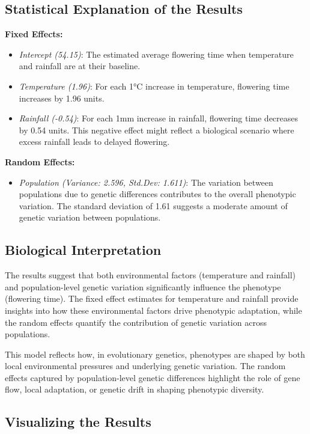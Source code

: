 \documentclass[12pt,a4paper]{article}
\begin{document}
\subsection{Statistical Explanation of the Results}

\textbf{Fixed Effects:}
\begin{itemize}
    \item \textit{Intercept (54.15)}: The estimated average flowering time when temperature and rainfall are at their baseline.
    \item \textit{Temperature (1.96)}: For each 1°C increase in temperature, flowering time increases by 1.96 units.
    \item \textit{Rainfall (-0.54)}: For each 1mm increase in rainfall, flowering time decreases by 0.54 units. This negative effect might reflect a biological scenario where excess rainfall leads to delayed flowering.
\end{itemize}

\textbf{Random Effects:}
\begin{itemize}
    \item \textit{Population (Variance: 2.596, Std.Dev: 1.611)}: The variation between populations due to genetic differences contributes to the overall phenotypic variation. The standard deviation of 1.61 suggests a moderate amount of genetic variation between populations.
\end{itemize}

\subsection{Biological Interpretation}

The results suggest that both environmental factors (temperature and rainfall) and population-level genetic variation significantly influence the phenotype (flowering time). The fixed effect estimates for temperature and rainfall provide insights into how these environmental factors drive phenotypic adaptation, while the random effects quantify the contribution of genetic variation across populations. 

This model reflects how, in evolutionary genetics, phenotypes are shaped by both local environmental pressures and underlying genetic variation. The random effects captured by population-level genetic differences highlight the role of gene flow, local adaptation, or genetic drift in shaping phenotypic diversity.

\subsection{Visualizing the Results}
\end{document}
